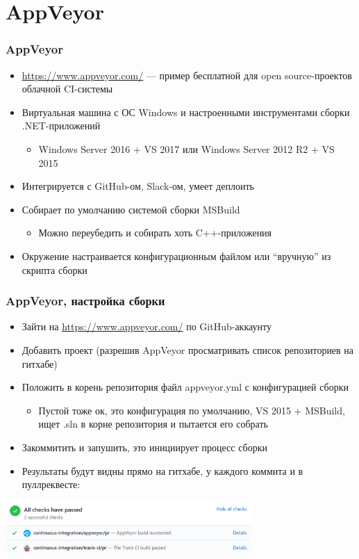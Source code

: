 \documentclass[xetex,mathserif,serif]{beamer}
\begin{document}
	\section{AppVeyor}

	\begin{frame}
		\frametitle{AppVeyor}
		\begin{itemize}
			\item \url{https://www.appveyor.com/} --- пример бесплатной для open source-проектов облачной CI-системы
			\item Виртуальная машина с ОС Windows и настроенными инструментами сборки .NET-приложений
			\begin{itemize}
				\item Windows Server 2016 + VS 2017 или Windows Server 2012 R2 + VS 2015
			\end{itemize}
			\item Интегрируется с GitHub-ом, Slack-ом, умеет деплоить
			\item Собирает по умолчанию системой сборки MSBuild
			\begin{itemize}
				\item Можно переубедить и собирать хоть C++-приложения
			\end{itemize}
			\item Окружение настраивается конфигурационным файлом или ``вручную'' из скрипта сборки
		\end{itemize}
	\end{frame}

	\begin{frame}
		\frametitle{AppVeyor, настройка сборки}
		\begin{itemize}
			\item Зайти на \url{https://www.appveyor.com/} по GitHub-аккаунту
			\item Добавить проект (разрешив AppVeyor просматривать список репозиториев на гитхабе)
			\item Положить в корень репозитория файл appveyor.yml с конфигурацией сборки
			\begin{itemize}
				\item Пустой тоже ок, это конфигурация по умолчанию, VS 2015 + MSBuild, ищет .sln в корне репозитория и пытается его собрать
			\end{itemize}
			\item Закоммитить и запушить, это инициирует процесс сборки
			\item Результаты будут видны прямо на гитхабе, у каждого коммита и в пуллреквесте:
		\end{itemize}
		\begin{center}
			\includegraphics[width=0.7\textwidth]{appVeyorSuccess.png}
		\end{center}
	\end{frame}
\end{document}
